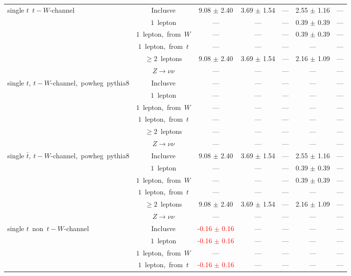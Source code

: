 \documentclass{article}
\begin{document}
\begin{longtable}{|l|c|c|c|c|c|c|}
\hline 
\multirow{6}{*}{single $t$~$t-W$-channel} & Inclusve  & 9.08 $\pm$ 2.40  & 3.69 $\pm$ 1.54  & ---  & 2.55 $\pm$ 1.16  & --- \\* 
 & $1$~lepton  & ---  & ---  & ---  & 0.39 $\pm$ 0.39  & --- \\* 
 & $1$~lepton,~from~$W$  & ---  & ---  & ---  & 0.39 $\pm$ 0.39  & --- \\* 
 & $1$~lepton,~from~$t$  & ---  & ---  & ---  & ---  & --- \\* 
 & $\ge2$~leptons  & 9.08 $\pm$ 2.40  & 3.69 $\pm$ 1.54  & ---  & 2.16 $\pm$ 1.09  & --- \\* 
 & $Z\rightarrow\nu\nu$  & ---  & ---  & ---  & ---  & --- \\* 
\hline 
\multirow{6}{*}{single $t,~t-W$-channel,~powheg~pythia8} & Inclusve  & ---  & ---  & ---  & ---  & --- \\* 
 & $1$~lepton  & ---  & ---  & ---  & ---  & --- \\* 
 & $1$~lepton,~from~$W$  & ---  & ---  & ---  & ---  & --- \\* 
 & $1$~lepton,~from~$t$  & ---  & ---  & ---  & ---  & --- \\* 
 & $\ge2$~leptons  & ---  & ---  & ---  & ---  & --- \\* 
 & $Z\rightarrow\nu\nu$  & ---  & ---  & ---  & ---  & --- \\* 
\hline 
\multirow{6}{*}{single $\bar{t},~t-W$-channel,~powheg~pythia8} & Inclusve  & 9.08 $\pm$ 2.40  & 3.69 $\pm$ 1.54  & ---  & 2.55 $\pm$ 1.16  & --- \\* 
 & $1$~lepton  & ---  & ---  & ---  & 0.39 $\pm$ 0.39  & --- \\* 
 & $1$~lepton,~from~$W$  & ---  & ---  & ---  & 0.39 $\pm$ 0.39  & --- \\* 
 & $1$~lepton,~from~$t$  & ---  & ---  & ---  & ---  & --- \\* 
 & $\ge2$~leptons  & 9.08 $\pm$ 2.40  & 3.69 $\pm$ 1.54  & ---  & 2.16 $\pm$ 1.09  & --- \\* 
 & $Z\rightarrow\nu\nu$  & ---  & ---  & ---  & ---  & --- \\* 
\hline 
\multirow{6}{*}{single $t$~non~$t-W$-channel} & Inclusve  & \textcolor{red}{ -0.16 $\pm$ 0.16 }  & ---  & ---  & ---  & --- \\* 
 & $1$~lepton  & \textcolor{red}{ -0.16 $\pm$ 0.16 }  & ---  & ---  & ---  & --- \\* 
 & $1$~lepton,~from~$W$  & ---  & ---  & ---  & ---  & --- \\* 
 & $1$~lepton,~from~$t$  & \textcolor{red}{ -0.16 $\pm$ 0.16 }  & ---  & ---  & ---  & --- \\* 

\end{longtable}
\end{document}
